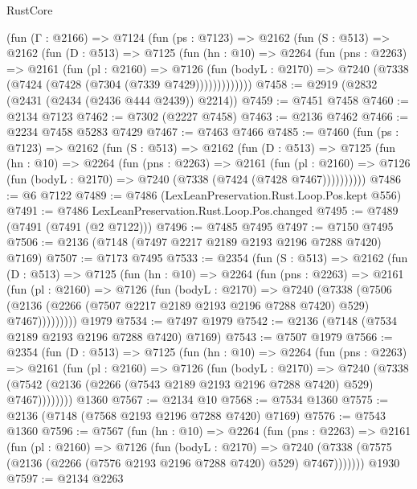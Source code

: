 \begin{lexlean}{RustCore}
\begin{coremodule}
    (fun (Γ : @2166) =>
    @7124
      (fun (ps : @7123) =>
      @2162
        (fun (S : @513) =>
        @2162
          (fun (D : @513) =>
          @7125
            (fun (hn : @10) =>
            @2264
              (fun (pns : @2263) =>
              @2161
                (fun (pl : @2160) =>
                @7126
                  (fun (bodyL : @2170) =>
                  @7240 (@7338 (@7424 (@7428 (@7304 (@7339 @7429)))))))))))))
@7458 := @2919 (@2832 (@2431 (@2434 (@2436 @444 @2439)) @2214))
@7459 := @7451 @7458
@7460 := @2134 @7123
@7462 := @7302 (@2227 @7458)
@7463 := @2136 @7462
@7466 := @2234 @7458 @5283 @7429
@7467 := @7463 @7466
@7485 := @7460
    (fun (ps : @7123) =>
    @2162
      (fun (S : @513) =>
      @2162
        (fun (D : @513) =>
        @7125
          (fun (hn : @10) =>
          @2264
            (fun (pns : @2263) =>
            @2161
              (fun (pl : @2160) =>
              @7126 (fun (bodyL : @2170) => @7240 (@7338 (@7424 (@7428 @7467))))))))))
@7486 := @6 @7122
@7489 := @7486 (LexLeanPreservation.Rust.Loop.Pos.kept @556)
@7491 := @7486 LexLeanPreservation.Rust.Loop.Pos.changed
@7495 := @7489 (@7491 (@7491 (@2 @7122)))
@7496 := @7485 @7495
@7497 := @7150 @7495
@7506 := @2136 (@7148 (@7497 @2217 @2189 @2193 @2196 @7288 @7420) @7169)
@7507 := @7173 @7495
@7533 := @2354
    (fun (S : @513) =>
    @2162
      (fun (D : @513) =>
      @7125
        (fun (hn : @10) =>
        @2264
          (fun (pns : @2263) =>
          @2161
            (fun (pl : @2160) =>
            @7126
              (fun (bodyL : @2170) =>
              @7240
                (@7338
                  (@7506
                    (@2136 (@2266 (@7507 @2217 @2189 @2193 @2196 @7288 @7420) @529) @7467)))))))))
    @1979
@7534 := @7497 @1979
@7542 := @2136 (@7148 (@7534 @2189 @2193 @2196 @7288 @7420) @7169)
@7543 := @7507 @1979
@7566 := @2354
    (fun (D : @513) =>
    @7125
      (fun (hn : @10) =>
      @2264
        (fun (pns : @2263) =>
        @2161
          (fun (pl : @2160) =>
          @7126
            (fun (bodyL : @2170) =>
            @7240
              (@7338 (@7542 (@2136 (@2266 (@7543 @2189 @2193 @2196 @7288 @7420) @529) @7467))))))))
    @1360
@7567 := @2134 @10
@7568 := @7534 @1360
@7575 := @2136 (@7148 (@7568 @2193 @2196 @7288 @7420) @7169)
@7576 := @7543 @1360
@7596 := @7567
    (fun (hn : @10) =>
    @2264
      (fun (pns : @2263) =>
      @2161
        (fun (pl : @2160) =>
        @7126
          (fun (bodyL : @2170) =>
          @7240 (@7338 (@7575 (@2136 (@2266 (@7576 @2193 @2196 @7288 @7420) @529) @7467)))))))
    @1930
@7597 := @2134 @2263

\end{coremodule}
\end{lexlean}
